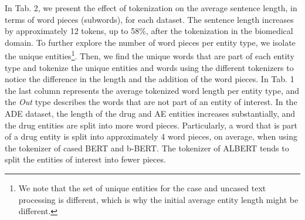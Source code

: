 \documentclass[runningheads]{llncs}
\begin{document}
In Tab. 2, we present the effect of tokenization on the average sentence length, in terms of word pieces (subwords), for each dataset. The sentence length increases by approximately 12 tokens, up to 58\%, after the tokenization in the biomedical domain. To further explore the number of word pieces per entity type, we isolate the unique entities\footnote{We note that the set of unique entities for the case and uncased text processing is different, which is why the initial average entity length might be different.}. Then, we find the unique words that are part of each entity type and tokenize the unique entities and words using the different tokenizers to notice the difference in the length and the addition of the word pieces. In Tab. 1 the last column represents the average tokenized word length per entity type, and the \textit{Out} type describes the words that are not part of an entity of interest. In the ADE dataset, the length of the drug and AE entities increases substantially, and the drug entities are split into more word pieces. Particularly, a word that is part of a drug entity is split into approximately 4 word pieces, on average, when using the tokenizer of cased BERT and b-BERT. The tokenizer of ALBERT tends to split the entities of interest into fewer pieces.
\vspace{-3mm}
\end{document}
